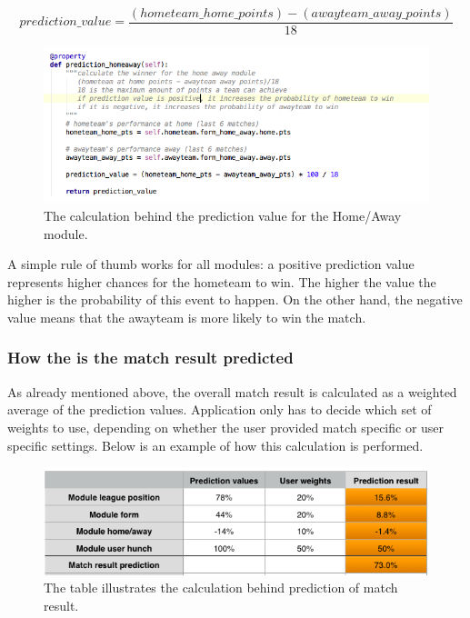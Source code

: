 \begin{equation}
   prediction\_value = \frac{(hometeam\_home\_points)-(awayteam\_away\_points)}{18}
\end{equation}

\begin{figure}[H]
	\begin{center}
		\includegraphics[width=.80\textwidth]{impl/images/predictionHomeAway}
		\caption{The calculation behind the prediction value for the Home/Away module.} \label{fig:using: predictionhomeaway}
	\end{center}
\end{figure}

A simple rule of thumb works for all modules: a positive prediction value represents higher chances for the hometeam to win. The higher the value the higher is the probability of this event to happen. On the other hand, the negative value means that the awayteam is more likely to win the match. 

\subsubsection*{How the is the match result predicted}
As already mentioned above, the overall match result is calculated as a weighted average of the prediction values. Application only has to decide which set of weights to use, depending on whether the user provided match specific or user specific settings. Below is an example of how this calculation is performed.

\begin{figure}[H]
	\begin{center}
		\includegraphics[width=.80\textwidth]{impl/images/overallPredictionCalculation}
		\caption{The table illustrates the calculation behind prediction of match result.} \label{fig:using: overallpredictioncalculation}
	\end{center}
\end{figure}

